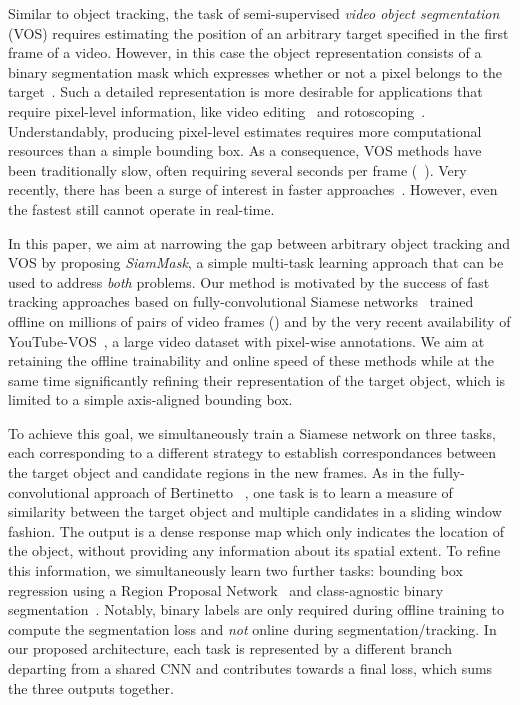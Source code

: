 Similar to object tracking, the task of semi-supervised \emph{video object segmentation} (VOS) requires estimating the position of an arbitrary target specified in the first frame of a video.
However, in this case the object representation consists of a binary segmentation mask which expresses whether or not a pixel belongs to the target~\cite{perazzi2016benchmark}.
Such a detailed representation is more desirable for applications that require pixel-level information, like video editing~\cite{perazzi2017video} and rotoscoping~\cite{miksik2017roam}.
Understandably, producing pixel-level estimates requires more computational resources than a simple bounding box.
As a consequence, VOS methods have been traditionally slow, often requiring several seconds per frame (\eg~\cite{wen2015jots,tsai2016video,perazzi2017learning,bao2018cnn}).
Very recently, there has been a surge of interest in faster approaches~\cite{Yang_2018_CVPR,marki2016bilateral,wug2018fast,cheng2018fast,chen2018blazingly,jampani2017video,hu2018videomatch}.
However, even the fastest still cannot operate in real-time.

In this paper, we aim at narrowing the gap between arbitrary object tracking and VOS by proposing \textit{SiamMask}, a simple multi-task learning approach that can be used to address \emph{both} problems.
Our method is motivated by the success of fast tracking approaches based on fully-convolutional Siamese networks~\cite{bertinetto2016fully} trained offline on millions of pairs of video frames (\eg \cite{SiamRPN,zhu2018distractor,he2018towards,yang2018learning}) and by the very recent availability of YouTube-VOS~\cite{xu2018youtube}, a large video dataset with pixel-wise annotations. 
We aim at retaining the offline trainability and online speed of these methods while at the same time significantly refining their representation of the target object, which is limited to a simple axis-aligned bounding box.

To achieve this goal, we simultaneously train a Siamese network on three tasks, each corresponding to a different strategy to establish correspondances between the target object and candidate regions in the new frames.
As in the fully-convolutional approach of Bertinetto \etal~\cite{bertinetto2016fully}, one task is to learn a measure of similarity between the target object and multiple candidates in a sliding window fashion.
The output is a dense response map which only indicates the location of the object, without providing any information about its spatial extent.
To refine this information, we simultaneously learn two further tasks: bounding box regression using a Region Proposal Network~\cite{ren2015faster,SiamRPN} and class-agnostic binary segmentation~\cite{DeepMask}.
Notably, binary labels are only required during offline training to compute the segmentation loss and \emph{not} online during segmentation/tracking. 
In our proposed architecture, each task is represented by a different branch departing from a shared CNN and contributes towards a final loss, which sums the three outputs together.

